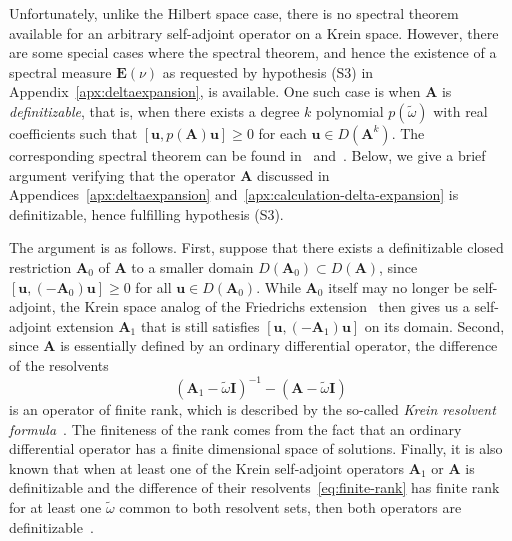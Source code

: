 \documentclass[aps, prd, amsmath, floats, floatfix, twocolumn, nofootinbib, superscriptaddress, showpacs]{revtex4-1}
\def\A{\mathbf{A}}
\def\E{\mathbf{E}}
\def\tomega{{\tilde{\omega}}}
\begin{document}
Unfortunately, unlike the Hilbert space case, there is no spectral
theorem available for an arbitrary self-adjoint operator on a Krein
space. However, there are some special cases where the spectral theorem,
and hence the existence of a spectral measure $\E(\nu)$ as requested by
hypothesis (S3) in Appendix~\ref{apx:deltaexpansion}, is available. One such
case is when $\A$ is \emph{definitizable}, that is, when there exists
a degree $k$ polynomial $p(\tomega)$ with real coefficients such that
$[\mathbf{u}, p(\A)\mathbf{u}] \geqslant 0$ for each $\mathbf{u} \in
D(\A^k)$. The corresponding spectral theorem can be found
in~\cite{Langer:1982} and~\cite{KaltenbaeckPruckner:2015}. Below, we
give a brief argument verifying that the operator $\A$ discussed in
Appendices~\ref{apx:deltaexpansion} and~\ref{apx:calculation-delta-expansion} is definitizable, hence
fulfilling hypothesis (S3).

The argument is as follows. First, suppose that there exists a definitizable closed
restriction $\A_0$ of $\A$ to a smaller domain $D(\A_0) \subset D(\A)$,
since $[\mathbf{u}, (-\A_0) \mathbf{u}] \geqslant 0$ for all $\mathbf{u}
\in D(\A_0)$. While $\A_0$ itself may no longer be self-adjoint, the
Krein space analog of the Friedrichs extension~\cite{Curgus:1989} then
gives us a self-adjoint extension $\A_1$ that is still satisfies
$[\mathbf{u}, (-\A_1) \mathbf{u}]$ on its domain. Second, since $\A$ is
essentially defined by an ordinary differential operator, the difference of the resolvents
\begin{equation} \label{eq:finite-rank}
(\A_1 - \tomega \mathbf{I})^{-1} - (\A - \tomega \mathbf{I})
\end{equation}
is an operator of finite rank, which is described by the so-called
\emph{Krein resolvent formula}~\cite[]{AkhiezerGlazman}.
The finiteness of the rank comes from the fact that an ordinary
differential operator has a finite dimensional space of solutions.
Finally, it is also known that when at least one of the Krein
self-adjoint operators $\A_1$ or $\A$ is definitizable and the
difference of their resolvents~\eqref{eq:finite-rank} has finite rank
for at least one $\tomega$ common to both resolvent sets, then both
operators are definitizable~\cite{JonasLanger:1979}.
\end{document}
